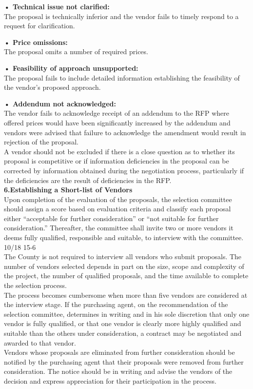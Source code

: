 \documentclass[12pt]{article}
\begin{document}
\textbf{• Technical issue not clarified:} \\The proposal is technically inferior and the
vendor fails to timely respond to a request for clarification.

\textbf{• Price omissions:} \\The proposal omits a number of required prices.

\textbf{• Feasibility of approach unsupported:} \\The proposal fails to include detailed
information establishing the feasibility of the vendor’s proposed approach.

\textbf{• Addendum not acknowledged:} \\The vendor fails to acknowledge receipt of
an addendum to the RFP where offered prices would have been
significantly increased by the addendum and vendors were advised that
failure to acknowledge the amendment would result in rejection of the
proposal.
\\A vendor should not be excluded if there is a close question as to whether its
proposal is competitive or if information deficiencies in the proposal can be
corrected by information obtained during the negotiation process, particularly if
the deficiencies are the result of deficiencies in the RFP. \\
\textbf{6.Establishing a Short-list of Vendors}
\\Upon completion of the evaluation of the proposals, the selection committee
should assign a score based on evaluation criteria and classify each proposal
either “acceptable for further consideration” or “not suitable for further
consideration.” Thereafter, the committee shall invite two or more vendors it
deems fully qualified, responsible and suitable, to interview with the committee. 
10/18 15-6
\\The County is not required to interview all vendors who submit proposals. The
number of vendors selected depends in part on the size, scope and complexity
of the project, the number of qualified proposals, and the time available to complete the selection process. \\The process becomes cumbersome when more
than five vendors are considered at the interview stage.
If the purchasing agent, on the recommendation of the selection committee,
determines in writing and in his sole discretion that only one vendor is fully
qualified, or that one vendor is clearly more highly qualified and suitable than the
others under consideration, a contract may be negotiated and awarded to that
vendor.
\\Vendors whose proposals are eliminated from further consideration should be
notified by the purchasing agent that their proposals were removed from further
consideration. The notice should be in writing and advise the vendors of the
decision and express appreciation for their participation in the process. 
\end{document}
